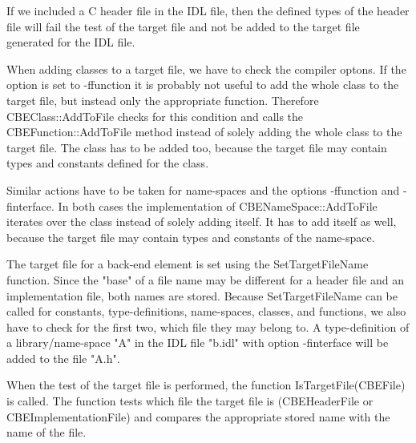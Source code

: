 If we included a C header file in the IDL file, then the defined types
of the header file will fail the test of the target file and not be
added to the target file generated for the IDL file.

When adding classes to a target file, we have to check the compiler
optons. If the option is set to -ffunction it is probably not useful
to add the whole class to the target file, but instead only the
appropriate function. Therefore CBEClass::AddToFile checks for this
condition and calls the CBEFunction::AddToFile method instead of
solely adding the whole class to the target file. The class has to be
added too, because the target file may contain types and constants
defined for the class.

Similar actions have to be taken for name-spaces and the options
-ffunction and -finterface. In both cases the implementation of
CBENameSpace::AddToFile iterates over the class instead of solely
adding itself. It has to add itself as well, because the target file
may contain types and constants of the name-space.

The target file for a back-end element is set using the
SetTargetFileName function. Since the "base" of a file name may be
different for a header file and an implementation file, both names are
stored. Because SetTargetFileName can be called for constants,
type-definitions, name-spaces, classes, and functions, we also have to
check for the first two, which file they may belong to. A
type-definition of a library/name-space "A" in the IDL file "b.idl"
with option -finterface will be added to the file "A.h".

When the test of the target file is performed, the function
IsTargetFile(CBEFile) is called. The function tests which file the
target file is (CBEHeaderFile or CBEImplementationFile) and compares
the appropriate stored name with the name of the file.
